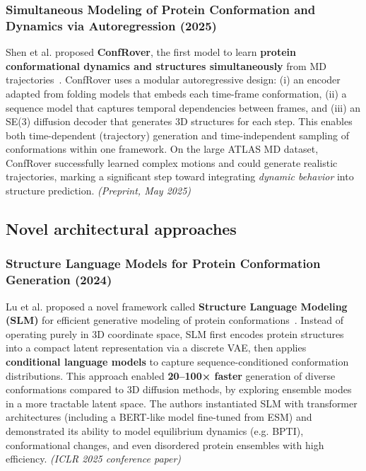 \subsubsection{Simultaneous Modeling of Protein Conformation and Dynamics via Autoregression (2025)}

Shen et al.
proposed \textbf{ConfRover}, the first model to learn \textbf{protein conformational dynamics and structures simultaneously} from MD trajectories~\cite{Shen2025ConfRover}.
ConfRover uses a modular autoregressive design: (i) an encoder adapted from folding models that embeds each time-frame conformation, (ii) a sequence model that captures temporal dependencies between frames, and (iii) an SE(3) diffusion decoder that generates 3D structures for each step.
This enables both time-dependent (trajectory) generation and time-independent sampling of conformations within one framework.
On the large ATLAS MD dataset, ConfRover successfully learned complex motions and could generate realistic trajectories, marking a significant step toward integrating \textit{dynamic behavior} into structure prediction. \textit{(Preprint, May 2025)}

\subsection{Novel architectural approaches}

\subsubsection{Structure Language Models for Protein Conformation Generation (2024)}

Lu et al.
proposed a novel framework called \textbf{Structure Language Modeling (SLM)} for efficient generative modeling of protein conformations~\cite{Lu2024SLM}.
Instead of operating purely in 3D coordinate space, SLM first encodes protein structures into a compact latent representation via a discrete VAE, then applies \textbf{conditional language models} to capture sequence-conditioned conformation distributions.
This approach enabled \textbf{20–100× faster} generation of diverse conformations compared to 3D diffusion methods, by exploring ensemble modes in a more tractable latent space.
The authors instantiated SLM with transformer architectures (including a BERT-like model fine-tuned from ESM) and demonstrated its ability to model equilibrium dynamics (e.g. BPTI), conformational changes, and even disordered protein ensembles with high efficiency. \textit{(ICLR 2025 conference paper)}

